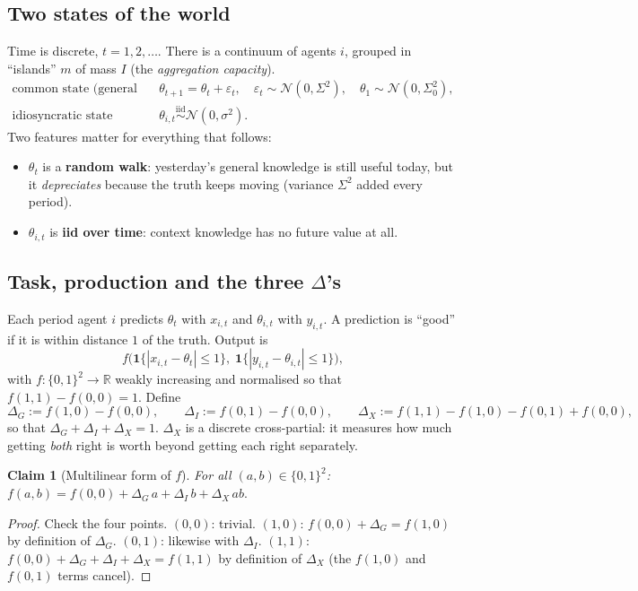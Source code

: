 \documentclass[11pt,a4paper]{article}
\newtheorem{claim}{Claim}[section]
\theoremstyle{definition}
\theoremstyle{remark}
\newcommand{\N}{\mathcal{N}}
\begin{document}
\subsection{Two states of the world}
Time is discrete, $t=1,2,\dots$. There is a continuum of agents $i$, grouped in ``islands'' $m$ of mass
$I$ (the \emph{aggregation capacity}).
\begin{align}
\text{common state (general knowledge):}\quad & \theta_{t+1}=\theta_t+\varepsilon_t,\quad
\varepsilon_t\sim\N(0,\Sigma^2),\quad \theta_1\sim\N(0,\Sigma_0^2), \label{eq:common}\\
\text{idiosyncratic state (context):}\quad & \theta_{i,t}\overset{\text{iid}}{\sim}\N(0,\sigma^2).
\label{eq:idio}
\end{align}
Two features matter for everything that follows:
\begin{itemize}[nosep]
\item $\theta_t$ is a \textbf{random walk}: yesterday's general knowledge is still useful today, but it
\emph{depreciates} because the truth keeps moving (variance $\Sigma^2$ added every period).
\item $\theta_{i,t}$ is \textbf{iid over time}: context knowledge has no future value at all.
\end{itemize}

\subsection{Task, production and the three $\Delta$'s}
Each period agent $i$ predicts $\theta_t$ with $x_{i,t}$ and $\theta_{i,t}$ with $y_{i,t}$. A prediction is
``good'' if it is within distance $1$ of the truth. Output is
\[
f\bigl(\mathbf 1\{|x_{i,t}-\theta_t|\le 1\},\;\mathbf 1\{|y_{i,t}-\theta_{i,t}|\le 1\}\bigr),
\]
with $f:\{0,1\}^2\to\mathbb R$ weakly increasing and normalised so that $f(1,1)-f(0,0)=1$.
Define
\[
\Delta_G:=f(1,0)-f(0,0),\qquad \Delta_I:=f(0,1)-f(0,0),\qquad \Delta_X:=f(1,1)-f(1,0)-f(0,1)+f(0,0),
\]
so that $\Delta_G+\Delta_I+\Delta_X=1$. $\Delta_X$ is a discrete cross-partial: it measures how much getting
\emph{both} right is worth beyond getting each right separately.

\begin{claim}[Multilinear form of $f$]\label{cl:multilinear}
For all $(a,b)\in\{0,1\}^2$: \quad $f(a,b)=f(0,0)+\Delta_G\,a+\Delta_I\,b+\Delta_X\,ab.$
\end{claim}
\begin{proof}
Check the four points. $(0,0)$: trivial. $(1,0)$: $f(0,0)+\Delta_G=f(1,0)$ by definition of $\Delta_G$.
$(0,1)$: likewise with $\Delta_I$. $(1,1)$: $f(0,0)+\Delta_G+\Delta_I+\Delta_X=f(1,1)$ by definition of
$\Delta_X$ (the $f(1,0)$ and $f(0,1)$ terms cancel).
\end{proof}
\end{document}
